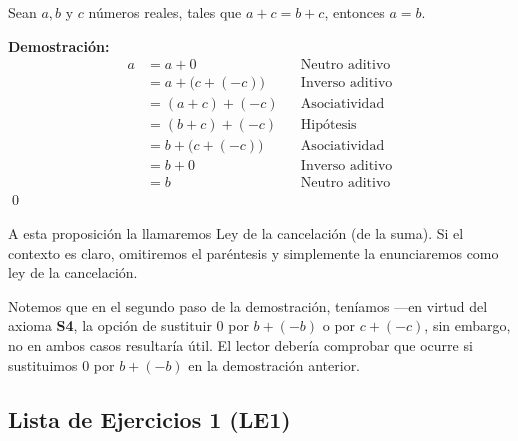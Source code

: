 \documentclass[11pt]{article}
\begin{document}
\pagebreak

Sean $a,b$ y $c$ números reales, tales que $a+c=b+c$, entonces $a=b$.

\textbf{Demostración:} \begin{align*}
    a &= a+0 && \text{Neutro aditivo}\\
    &= a+ \bigl(c+(-c)\bigr) && \text{Inverso aditivo}\\
    &= (a+c) + (-c) && \text{Asociatividad}\\
    &= (b+c) + (-c) && \text{Hipótesis}\\
    &= b + \bigl(c+(-c)\bigr) && \text{Asociatividad}\\
    &= b + 0 && \text{Inverso aditivo}\\
    &= b && \text{Neutro aditivo}
\end{align*}\qed

A esta proposición la llamaremos Ley de la cancelación (de la suma). Si el contexto es claro, omitiremos el paréntesis y simplemente la enunciaremos como ley de la cancelación.

Notemos que en el segundo paso de la demostración, teníamos —en virtud del axioma \textbf{S4}, la opción de sustituir $0$ por $b+(-b)$ o por $c+(-c)$, sin embargo, no en ambos casos resultaría útil. El lector debería comprobar que ocurre si sustituimos $0$ por $b+(-b)$ en la demostración anterior.

\subsection*{Lista de Ejercicios 1 (LE1)}
\end{document}
